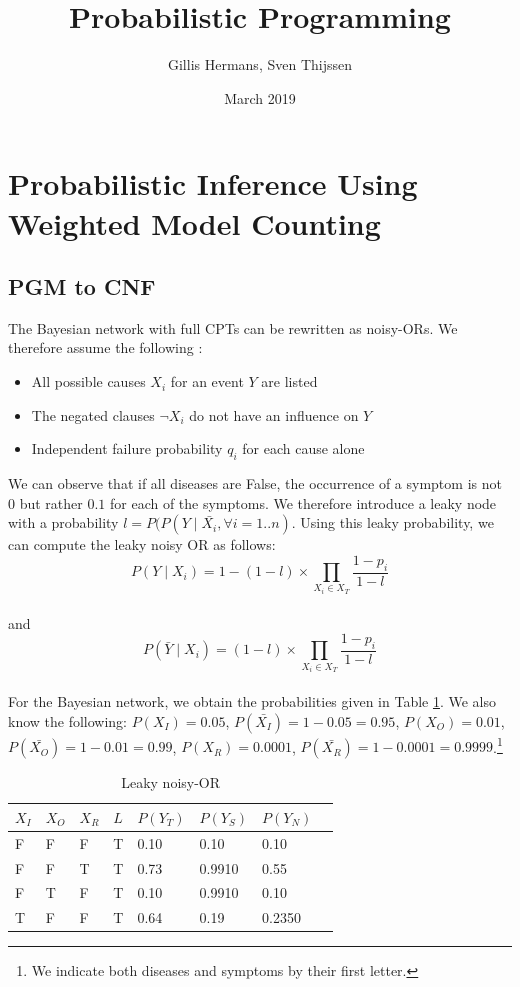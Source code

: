 \documentclass{article}
\title{Probabilistic Programming}
\author{Gillis Hermans, Sven Thijssen}
\date{March 2019}
\begin{document}
\maketitle
\tableofcontents

\newpage

\section{Probabilistic Inference Using Weighted Model Counting}

\subsection{PGM to CNF}

The Bayesian network with full CPTs can be rewritten as noisy-ORs. We therefore assume the following \cite{noisyor}:
\begin{itemize}
    \item All possible causes $X_i$ for an event $Y$ are listed
    \item The negated clauses $\neg X_i$ do not have an influence on $Y$
    \item Independent failure probability $q_i$ for each cause alone
\end{itemize}

We can observe that if all diseases are False, the occurrence of a symptom is not $0$ but rather $0.1$ for each of the symptoms. We therefore introduce a leaky node with a probability $l = P(P(Y \mid \bar{X_i}, \forall i = 1..n)$.
Using this leaky probability, we can compute the leaky noisy OR as follows:
$$P(Y \mid X_i) = 1-(1-l) \times \prod_{X_i \in X_T}\frac{1-p_i}{1-l}$$\\
and
$$P(\bar{Y} \mid X_i) = (1-l) \times \prod_{X_i \in X_T}\frac{1-p_i}{1-l}$$\\

For the Bayesian network, we obtain the probabilities given in Table \ref{tab:leakynoisyor}. We also know the following:
$P(X_I) = 0.05$, 
$P(\bar{X_I}) = 1 - 0.05 = 0.95$, 
$P(X_O) = 0.01$, 
$P(\bar{X_O}) = 1 - 0.01 = 0.99$, 
$P(X_R) = 0.0001$, 
$P(\bar{X_R}) = 1 - 0.0001 = 0.9999$.\footnote{We indicate both diseases and symptoms by their first letter.}

\begin{table}[h]
\centering
\begin{tabular}{l l l l | l | l | l | l}
	\hline
	$X_I$	&	$X_O$	&	$X_R$	&	$L$		&	$P(Y_T)$		&	$P(Y_S)$		&	$P(Y_N)$\\
	\hline
	F		&	F		&	F		&	T		&	0.10			&	0.10			&	0.10\\
	F		&	F		&	T		&	T		&	0.73			&	0.9910		&	0.55\\
	F		&	T		&	F		&	T		&	0.10			&	0.9910		&	0.10\\
	T		&	F		&	F		&	T		&	0.64			&	0.19			&	0.2350\\
	\hline
\end{tabular}
\caption{Leaky noisy-OR}
\label{tab:leakynoisyor}
\end{table}
\end{document}
